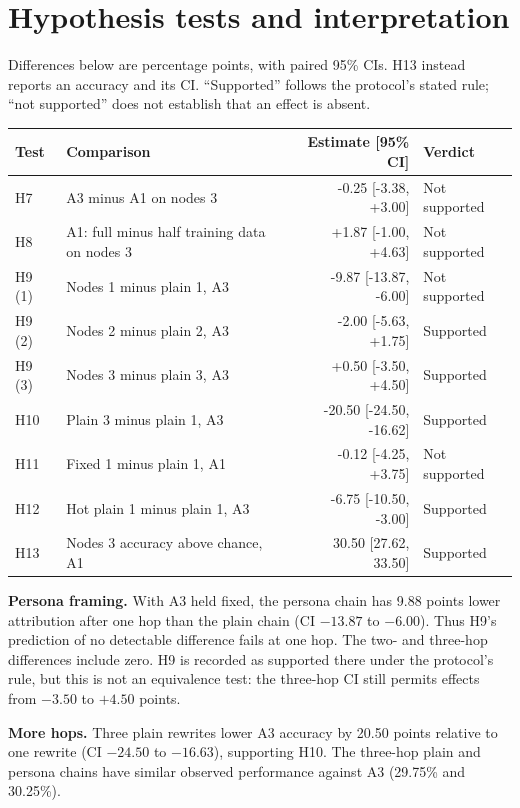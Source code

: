 \documentclass[11pt]{article}
\begin{document}
\section{Hypothesis tests and interpretation}
Differences below are percentage points, with paired 95\% CIs. H13 instead
reports an accuracy and its CI. ``Supported'' follows the protocol's stated
rule; ``not supported'' does not establish that an effect is absent.
\begin{center}
\small
\begin{tabular}{llrl}
\toprule
Test & Comparison & Estimate [95\% CI] & Verdict \\
\midrule
H7 & A3 minus A1 on nodes 3 & -0.25 [-3.38, +3.00] & Not supported \\
H8 & A1: full minus half training data on nodes 3 & +1.87 [-1.00, +4.63] & Not supported \\
H9 (1) & Nodes 1 minus plain 1, A3 & -9.87 [-13.87, -6.00] & Not supported \\
H9 (2) & Nodes 2 minus plain 2, A3 & -2.00 [-5.63, +1.75] & Supported \\
H9 (3) & Nodes 3 minus plain 3, A3 & +0.50 [-3.50, +4.50] & Supported \\
H10 & Plain 3 minus plain 1, A3 & -20.50 [-24.50, -16.62] & Supported \\
H11 & Fixed 1 minus plain 1, A1 & -0.12 [-4.25, +3.75] & Not supported \\
H12 & Hot plain 1 minus plain 1, A3 & -6.75 [-10.50, -3.00] & Supported \\
H13 & Nodes 3 accuracy above chance, A1 & 30.50 [27.62, 33.50] & Supported \\
\bottomrule
\end{tabular}
\end{center}

\textbf{Persona framing.} With A3 held fixed, the persona chain has 9.88 points
lower attribution after one hop than the plain chain (CI $-13.87$ to $-6.00$).
Thus H9's prediction of no detectable difference fails at one hop. The two-
and three-hop differences include zero. H9 is recorded as supported there
under the protocol's rule, but this is not an equivalence test: the three-hop
CI still permits effects from $-3.50$ to $+4.50$ points.

\textbf{More hops.} Three plain rewrites lower A3 accuracy by 20.50 points
relative to one rewrite (CI $-24.50$ to $-16.63$), supporting H10. The three-hop
plain and persona chains have similar observed performance against A3
(29.75\% and 30.25\%).
\end{document}
